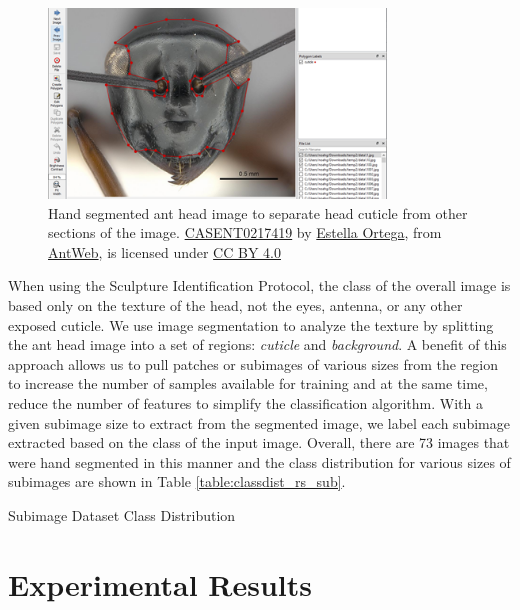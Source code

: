 \documentclass{aci}
\begin{document}
\begin{figure}[h]
  \centering
  \includegraphics[width=0.8\textwidth]{assets/images/segmented_1.png}
  \caption{Hand segmented ant head image to separate head cuticle from other
    sections of the image.
    \href{https://www.antweb.org/bigPicture.do?name=casent0217419&shot=h&number=1}{CASENT0217419}
    by \href{https://www.antweb.org/artist.do?id=92}{Estella Ortega}, from
    \href{https://www.antweb.org}{AntWeb}, is licensed under
    \href{https://creativecommons.org/licenses/by/4.0/}{CC BY 4.0}}
  \label{fig:segmented_1}
\end{figure}

When using the Sculpture Identification Protocol, the class of the overall image
is based only on the texture of the head, not the eyes, antenna, or any other
exposed cuticle. We use image segmentation to analyze the texture by splitting
the ant head image into a set of regions: \textit{cuticle} and
\textit{background}. A benefit of this approach allows us to pull patches or
subimages of various sizes from the region to increase the number of samples
available for training and at the same time, reduce the number of features to
simplify the classification algorithm. With a given subimage size to extract
from the segmented image, we label each subimage extracted based on the class of
the input image. Overall, there are 73 images that were hand segmented in this
manner and the class distribution for various sizes of subimages are shown in
Table \ref{table:classdist_rs_sub}.

\begin{table}[h]
  \centering
  \caption{Subimage Dataset Class Distribution}
  \label{table:classdist_rs_sub}
  
\end{table}

\section{Experimental Results}
\end{document}
